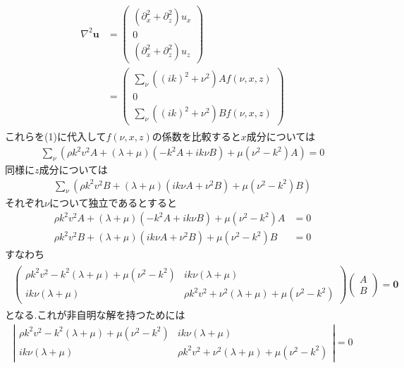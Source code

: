 \documentclass[uplatex,a4j,11pt,dvipdfmx]{jsarticle}
\begin{document}
\begin{align}
  \begin{split}
    \nabla^2{\bm u}&=\left(
      \begin{array}{c}
        (\partial_x^2+\partial_z^2)u_x\\
        0\\
        (\partial_x^2+\partial_z^2)u_z
      \end{array}
    \right)\\
    &=\left(
      \begin{array}{c}
        \sum_\nu ((ik)^2+\nu^2)Af(\nu,x,z)\\
        0\\
        \sum_\nu ((ik)^2+\nu^2)Bf(\nu,x,z)
      \end{array}
    \right)
  \end{split}
\end{align}
これらを(1)に代入して$f(\nu,x,z)$の係数を比較すると$x$成分については
\begin{align}
  \sum_\nu\left(\rho k^2v^2A+(\lambda+\mu)(-k^2A+ik\nu B)+\mu(\nu^2-k^2)A\right)=0
\end{align}
同様に$z$成分については
\begin{align}
  \sum_\nu\left(\rho k^2v^2B+(\lambda+\mu)(ik\nu A+\nu^2B)+\mu(\nu^2-k^2)B\right)
\end{align}
それぞれ$\nu$について独立であるとすると
\begin{align}
  \rho k^2v^2A+(\lambda+\mu)(-k^2A+ik\nu B)+\mu(\nu^2-k^2)A&=0\\
  \rho k^2v^2B+(\lambda+\mu)(ik\nu A+\nu^2B)+\mu(\nu^2-k^2)B&=0
\end{align}
すなわち
\begin{align}
  \begin{split}
    \left(
      \begin{array}{cc}
      \rho k^2v^2-k^2(\lambda+\mu)+\mu(\nu^2-k^2)&ik\nu(\lambda+\mu)\\
      ik\nu(\lambda+\mu)&\rho k^2v^2+\nu^2(\lambda+\mu)+\mu(\nu^2-k^2)
    \end{array}
    \right)
    \left(
      \begin{array}{c}
        A\\B
      \end{array}
    \right)
    ={\bm 0}
  \end{split}
\end{align}
となる.これが非自明な解を持つためには
\begin{align}
  \left|
    \begin{array}{cc}
    \rho k^2v^2-k^2(\lambda+\mu)+\mu(\nu^2-k^2)&ik\nu(\lambda+\mu)\\
    ik\nu(\lambda+\mu)&\rho k^2v^2+\nu^2(\lambda+\mu)+\mu(\nu^2-k^2)
  \end{array}
  \right|=0
\end{align}
\end{document}
